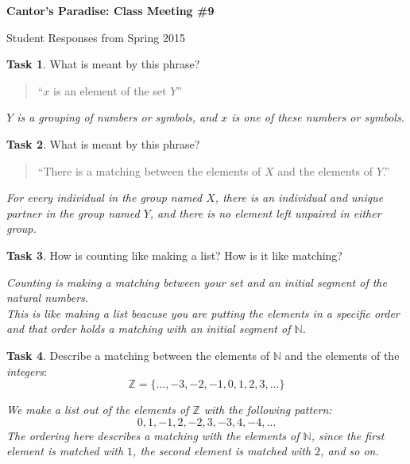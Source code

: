 \documentclass[12pt]{amsart}
\theoremstyle{definition}
\newtheorem{task}{Task}
\begin{document}
\begin{center}
\textbf{\Huge
Cantor's Paradise: Class Meeting \#9
}
\end{center}
\vspace{.25in}
Student Responses from Spring 2015
\vspace{.25in}

\begin{task}
What is meant by this phrase?
\begin{quote}
``$x$ is an element of the set $Y$''
\end{quote}
\end{task}

\begin{center}
\textit{
$Y$ is a grouping of numbers or symbols, and $x$ is one of these numbers or symbols.
}
\end{center}
\vspace{.25in}

\begin{task}
What is meant by this phrase?
\begin{quote}
``There is a matching between the elements of $X$ and the elements of $Y$.''
\end{quote}
\end{task}

\begin{center}
\textit{
For every individual in the group named $X$, there is an individual and unique partner in the group named $Y$, and there is no element left unpaired in either group.
}
\end{center}
\vspace{.25in}

\begin{task}
How is counting like making a list? How is it like matching?
\end{task}

\begin{center}
\textit{
Counting is making a matching between your set and an initial segment of the natural numbers.}\\

\textit{This is like making a list beacuse you are putting the elements in a specific order and that order holds a matching with an initial segment of $\mathbb{N}$.
}
\end{center}
\vspace{.25in}

\begin{task}
Describe a matching between the elements of $\mathbb{N}$ and the elements of the \emph{integers}:
\[
\mathbb{Z} = \{ \ldots, -3, -2, -1, 0, 1, 2, 3, \ldots \}
\]
\end{task}

\begin{center}
\textit{ We make a list out of the elements of $\mathbb{Z}$ with the following pattern:
\[
0, 1, -1, 2, -2, 3, -3, 4, -4, \ldots
\]
The ordering here describes a matching with the elements of $\mathbb{N}$, since the first element is matched with $1$, the second element is matched with $2$, and so on.
}
\end{center}
\end{document}
